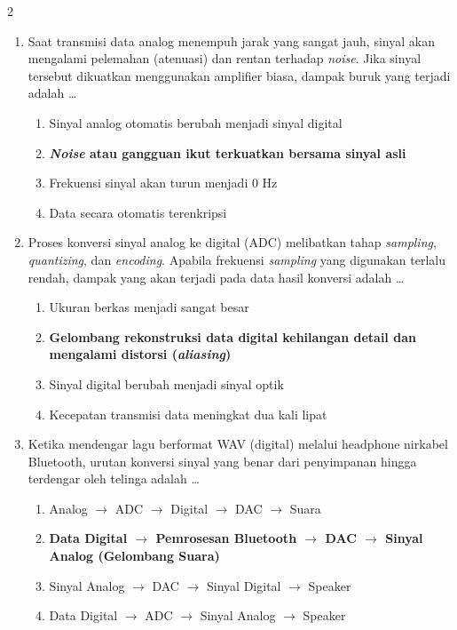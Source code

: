 \documentclass[10pt,a4paper]{article}
\begin{document}
\begin{multicols}{2}
\begin{enumerate}
    \item Saat transmisi data analog menempuh jarak yang sangat jauh, sinyal akan mengalami pelemahan (atenuasi) dan rentan terhadap \emph{noise}. Jika sinyal tersebut dikuatkan menggunakan amplifier biasa, dampak buruk yang terjadi adalah \dots
    \begin{enumerate}
        \item Sinyal analog otomatis berubah menjadi sinyal digital
        \item \textbf{\emph{Noise} atau gangguan ikut terkuatkan bersama sinyal asli}
        \item Frekuensi sinyal akan turun menjadi 0 Hz
        \item Data secara otomatis terenkripsi
    \end{enumerate}

    \item Proses konversi sinyal analog ke digital (ADC) melibatkan tahap \emph{sampling}, \emph{quantizing}, dan \emph{encoding}. Apabila frekuensi \emph{sampling} yang digunakan terlalu rendah, dampak yang akan terjadi pada data hasil konversi adalah \dots
    \begin{enumerate}
        \item Ukuran berkas menjadi sangat besar
        \item \textbf{Gelombang rekonstruksi data digital kehilangan detail dan mengalami distorsi (\emph{aliasing})}
        \item Sinyal digital berubah menjadi sinyal optik
        \item Kecepatan transmisi data meningkat dua kali lipat
    \end{enumerate}

    \item Ketika mendengar lagu berformat WAV (digital) melalui headphone nirkabel Bluetooth, urutan konversi sinyal yang benar dari penyimpanan hingga terdengar oleh telinga adalah \dots
    \begin{enumerate}
        \item Analog $\rightarrow$ ADC $\rightarrow$ Digital $\rightarrow$ DAC $\rightarrow$ Suara
        \item \textbf{Data Digital $\rightarrow$ Pemrosesan Bluetooth $\rightarrow$ DAC $\rightarrow$ Sinyal Analog (Gelombang Suara)}
        \item Sinyal Analog $\rightarrow$ DAC $\rightarrow$ Sinyal Digital $\rightarrow$ Speaker
        \item Data Digital $\rightarrow$ ADC $\rightarrow$ Sinyal Analog $\rightarrow$ Speaker
    \end{enumerate}


\end{enumerate}
\end{multicols}
\end{document}
